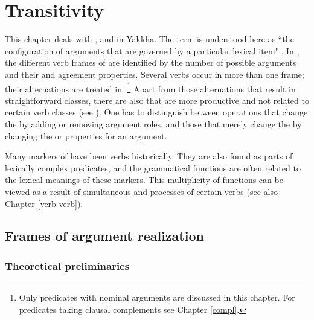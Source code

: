 ﻿%

\chapter{Transitivity}\label{verb-val}

This chapter deals with ,  and  in Yakkha. The term  is understood here as “the configuration of arguments that are governed by a particular lexical item" \citep[1130]{Haspelmath2004_Valency}. In , the  different verb frames of  are identified by the number of possible arguments and their  and agreement properties. Several verbs occur in more than one frame; their alternations are treated in .\footnote{Only predicates with nominal arguments are discussed in this chapter. For predicates taking clausal complements see Chapter \ref{compl}.} Apart from those alternations that result in straightforward classes, there are also  that are more productive and not related to certain verb classes (see ). One has to distinguish between operations that change the  by adding or removing argument roles, and those that merely change the  by changing the  or  properties for an argument. 

Many markers of  have been verbs historically. They are also found as parts of lexically complex predicates, and the grammatical functions are often related to the lexical meanings of these markers. This multiplicity of functions can be viewed as a result of simultaneous  and  processes of certain verbs (see also Chapter \ref{verb-verb}). 

\section{Frames of argument realization}\label{frames}

\subsection{Theoretical preliminaries}

